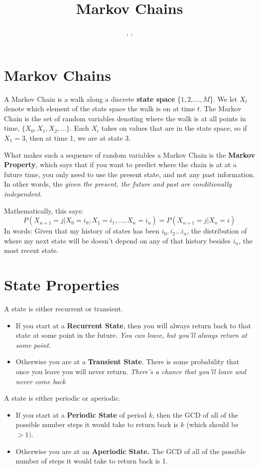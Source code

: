 \documentclass[11.5pt]{article}
\title{Markov Chains}
\author{\shira, \tim, \creds}
\begin{document}
\maketitle

\begin{notes}

\section*{Markov Chains}
A Markov Chain is a walk along a discrete \textbf{state space} \{$1, 2, \dots, M$\}. We let $X_t$ denote which element of the state space the walk is on at time $t$. The Markov Chain is the set of random variables denoting where the walk is at all points in time, $\{X_0, X_1, X_2, \dots \}$. Each $X_i$ takes on values that are in the state space, so if $X_1 = 3$, then at time 1, we are at state 3. 

What makes such a sequence of random variables a Markov Chain is the \textbf{Markov Property}, which says that if you want to predict where the chain is at at a future time, you only need to use the present state, and not any past information. In other words, the \emph{given the present, the future and past are conditionally independent}. 

Mathematically, this says: 
\[P(X_{n+1} = j | X_0 = i_0, X_1 = i_1, \dots, X_n = i_n) = P(X_{n+1} = j | X_n = i)\]
In words: Given that my history of states has been $i_0, i_2 \ldots i_n$, the distribution of where my next state will be doesn't depend on any of that history besides $i_n$, the most recent state. 
\section*{State Properties}
A state is either recurrent or transient.
\begin{itemize}
\item If you start at a \textbf{Recurrent State}, then you will always return back to that state at some point in the future.  \emph{You can leave, but you'll always return at some point.} 
\item Otherwise you are at a \textbf{Transient State}. There is some probability that once you leave you will never return. \emph{There's a chance that you'll leave and never come back}
\end{itemize}
A state is either periodic or aperiodic.
\begin{itemize}
\item If you start at a \textbf{Periodic State} of period $k$, then the GCD of all of the possible number steps it would take to return back is  $k$ (which should be $> 1)$.
\item Otherwise you are at an \textbf{Aperiodic State.} The GCD of all of the possible number of steps it would take to return back is 1.
\end{itemize}



\end{notes}
\end{document}
